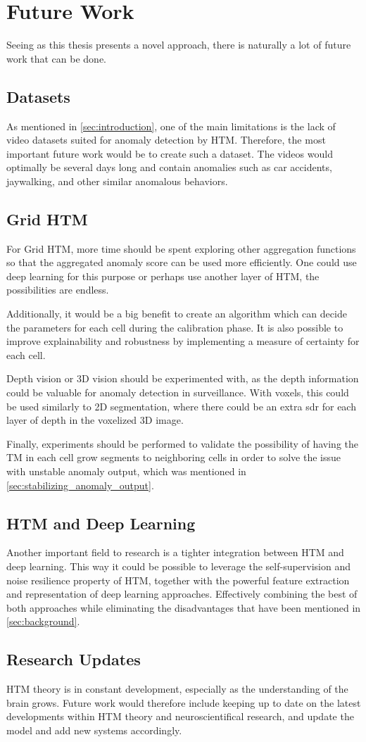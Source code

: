 \section{Future Work}
Seeing as this thesis presents a novel approach, there is naturally a lot of future work that can be done.
\subsection*{Datasets}
As mentioned in \autoref{sec:introduction}, one of the main limitations is the lack of video datasets suited for anomaly detection by HTM. Therefore, the most important future work would be to create such a dataset. The videos would optimally be several days long and contain anomalies such as car accidents, jaywalking, and other similar anomalous behaviors.
\par
\subsection*{Grid HTM}
For Grid HTM, more time should be spent exploring other aggregation functions so that the aggregated anomaly score can be used more efficiently. One could use deep learning for this purpose or perhaps use another layer of HTM, the possibilities are endless.
\par
Additionally, it would be a big benefit to create an algorithm which can decide the parameters for each cell during the calibration phase. It is also possible to improve explainability and robustness by implementing a measure of certainty for each cell.
\par
Depth vision or 3D vision should be experimented with, as the depth information could be valuable for anomaly detection in surveillance. With voxels, this could be used similarly to 2D segmentation, where there could be an extra \gls*{sdr} for each layer of depth in the voxelized 3D image.
\par
Finally, experiments should be performed to validate the possibility of having the TM in each cell grow segments to neighboring cells in order to solve the issue with unstable anomaly output, which was mentioned in \autoref{sec:stabilizing_anomaly_output}.
\subsection*{HTM and Deep Learning}
Another important field to research is a tighter integration between HTM and deep learning. This way it could be possible to leverage the self-supervision and noise resilience property of HTM, together with the powerful feature extraction and representation of deep learning approaches. Effectively combining the best of both approaches while eliminating the disadvantages that have been mentioned in \autoref{sec:background}.
\par
\subsection*{Research Updates}
HTM theory is in constant development, especially as the understanding of the brain grows. Future work would therefore include keeping up to date on the latest developments within HTM theory and neuroscientifical research, and update the model and add new systems accordingly.